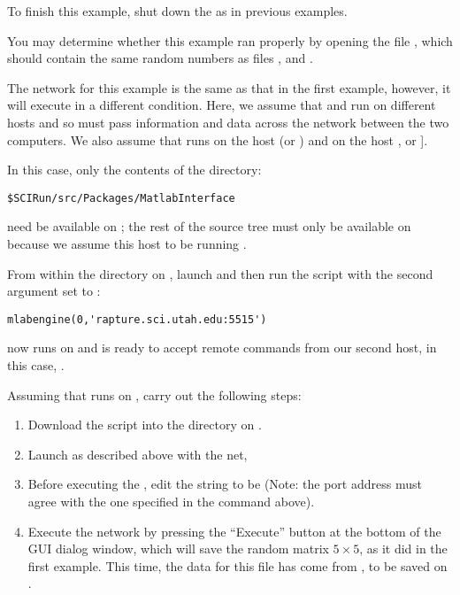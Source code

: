 To finish this example, shut down the \mlm{} as in previous 
examples.

You may determine whether this example ran properly by opening the file
, which should contain the same random numbers as files
, and .


The network for this example is the same as that in the first example,
however, it will execute in a different condition. Here, we assume that \m{}
and \sr{} run on different hosts and so must pass information and data
across the network between the two computers.  We also assume that \m{}
runs on the host  (or ) and \sr{} on
the host , or ].

In this case, only the contents of the directory: 
%
\begin{verbatim}
$SCIRun/src/Packages/MatlabInterface
\end{verbatim}
%
need be available on ; the rest of the \sr{} source tree must
only be available on  because we assume this host to be
running \sr{}.

From within the directory on , launch \m{} and then run the
 script with the second argument set to
:
%
\begin{verbatim}
mlabengine(0,'rapture.sci.utah.edu:5515')
\end{verbatim}
%
\m{} now runs on  and is ready to accept remote commands from
our second host, in this case, .

Assuming that \sr{} runs on , carry out the
following steps:
%
\begin {enumerate}
  \item Download the script  
        into the \sr{} directory on . 
  \item Launch \sr{} as described above with the  
        net,
  \item Before executing the \mlm{}, edit the  
        string to be  (Note: the port address
        must agree with the one specified in the  command
        above).
  \item Execute the network by pressing the ``Execute'' button at 
        the bottom of the \mlm{} GUI dialog window, which will save the
        random matrix $5\times 5$, as it did in the first example.  This
        time, the data for this file has come from , to be
        saved on .
\end{enumerate}

